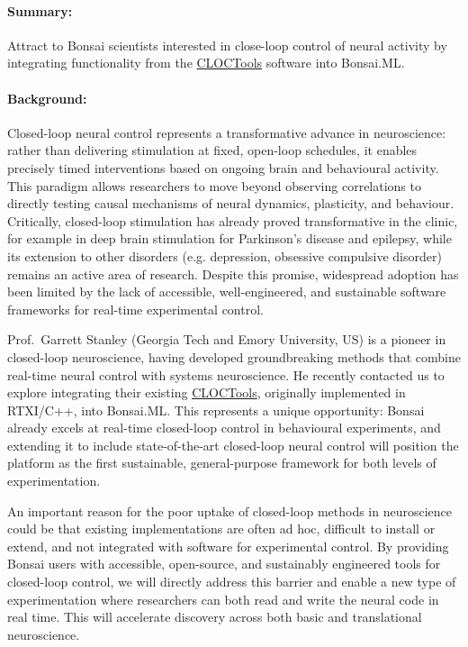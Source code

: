\paragraph{Summary:} Attract to Bonsai scientists interested in close-loop
control of neural activity by integrating functionality from
the \href{https://cloctools.github.io/}{CLOCTools} software into Bonsai.ML.

\paragraph{Background:} Closed-loop neural control represents a transformative
advance in neuroscience:  rather than delivering stimulation at fixed,
open-loop schedules, it enables precisely timed interventions based on ongoing
brain and behavioural activity. This paradigm allows researchers to move beyond
observing correlations to  directly testing causal mechanisms of neural
dynamics, plasticity, and behaviour. Critically, closed-loop stimulation has
already proved transformative in the  clinic, for example in deep brain
stimulation for Parkinson’s disease and  epilepsy, while its extension to other
disorders (e.g. depression, obsessive  compulsive disorder) remains an active
area of research. Despite this promise, widespread adoption has been limited
by the lack of accessible, well-engineered,  and sustainable software
frameworks for real-time experimental control.

Prof.~Garrett Stanley (Georgia Tech and Emory University, US) is a pioneer in
closed-loop neuroscience, having developed groundbreaking methods that combine
real-time neural control with systems neuroscience. He recently contacted us to
explore integrating their existing
\href{https://cloctools.github.io/}{CLOCTools}, originally implemented in
RTXI/C++, into Bonsai.ML.  This represents a unique opportunity: Bonsai already
excels at real-time closed-loop control in behavioural experiments, and
extending it to include state-of-the-art closed-loop neural control will
position the platform as the first sustainable, general-purpose framework for
both levels of experimentation.

An important reason for the poor uptake of closed-loop methods in neuroscience
could be that existing implementations are often ad hoc, difficult to install
or  extend, and not integrated with software for experimental control. By
providing Bonsai users with accessible, open-source, and sustainably engineered
tools for closed-loop control, we will directly address this barrier and enable
a new type of experimentation where researchers can both read and write the
neural code in real time. This will accelerate discovery across both basic and
translational neuroscience.

